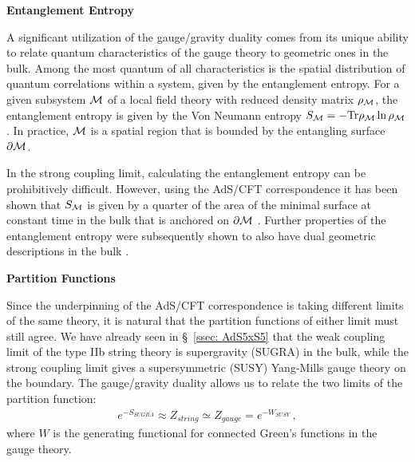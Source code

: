 \documentclass[../PhD.tex]{subfiles}
\begin{document}
\pagebreak

{\bf Entanglement Entropy}

A significant utilization of the gauge/gravity duality comes from its unique ability to relate quantum characteristics of the gauge theory to geometric ones in the bulk. Among the most quantum of all characteristics is the spatial distribution of quantum correlations within a system, given by the entanglement entropy. For a given subsystem $\mathcal M$ of a local field theory with reduced density matrix $\rho_{\mathcal M}$, the entanglement entropy is given by the Von Neumann entropy $S_{\mathcal M} = - \text{Tr} \rho_{\mathcal M} \ln \rho_{\mathcal M}$. In practice, $\mathcal M$ is a spatial region that is bounded by the entangling surface $\partial \mathcal M$.

In the strong coupling limit, calculating the entanglement entropy can be prohibitively difficult. However, using the AdS/CFT correspondence it has been shown that $S_{\mathcal M}$ is given by a quarter of the area of the minimal surface at constant time in the bulk that is anchored on $\partial \mathcal M$ \cite{hep-th/0603001}. Further properties of the entanglement entropy were subsequently shown to also have dual geometric descriptions in the bulk \cite{1304.4926}.

{\bf Partition Functions}

Since the underpinning of the AdS/CFT correspondence is taking different limits of the same theory, it is natural that the partition functions of either limit must still agree. We have already seen in \S~\!\ref{ssec: AdS5xS5} that the weak coupling limit of the type IIb string theory is supergravity (SUGRA) in the bulk, while the strong coupling limit gives a supersymmetric (SUSY) Yang-Mills gauge theory on the boundary. The gauge/gravity duality allows us to relate the two limits of the partition function:
\begin{align}
\label{partition functions}
e^{-S_{SUGRA}} \approx Z_{string} \simeq Z_{gauge} = e^{-W_{SUSY}} \, ,
\end{align}
where $W$ is the generating functional for connected Green's functions in the gauge theory.
\end{document}
